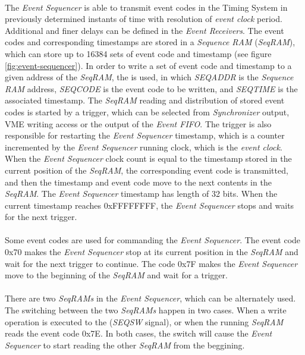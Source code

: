 \documentclass[openany]{article}
\begin{document}
			\paragraph{} The \emph{Event Sequencer} is able to transmit event codes in the Timing System in previously determined instants of time with resolution of \emph{event clock} period. Additional and finer delays can be defined in the \emph{Event Receivers}. The event codes and corresponding timestamps are stored in a \emph{Sequence RAM} (\emph{SeqRAM}), which can store up to 16384 sets of event code and timestamp (see figure \ref{fig:event-sequencer}). In order to write a set of event code and timestamp to a given address of the \emph{SeqRAM}, the  is used, in which \emph{SEQADDR} is the \emph{Sequence RAM} address, \emph{SEQCODE} is the event code to be written, and \emph{SEQTIME} is the associated timestamp. The \emph{SeqRAM} reading and distribution of stored event codes is started by a trigger, which can be selected from \emph{Synchronizer} output, VME writing access or the output of the \emph{Event FIFO}. The trigger is also responsible for restarting the \emph{Event Sequencer} timestamp, which is a counter incremented by the \emph{Event Sequencer} running clock, which is the \emph{event clock}. When the \emph{Event Sequencer} clock count is equal to the timestamp stored in the current position of the \emph{SeqRAM}, the corresponding event code is transmitted, and then the timestamp and event code move to the next contents in the \emph{SeqRAM}. The \emph{Event Sequencer} timestamp has length of 32 bits. When the current timestamp reaches 0xFFFFFFFF, the \emph{Event Sequencer} stops and waits for the next trigger.
			\paragraph{} Some event codes are used for commanding the \emph{Event Sequencer}. The event code 0x70 makes the \emph{Event Sequencer} stop at its current position in the \emph{SeqRAM} and wait for the next trigger to continue. The code 0x7F makes the \emph{Event Sequencer} move to the beginning of the \emph{SeqRAM} and wait for a trigger. 
			\paragraph{} There are two \emph{SeqRAMs} in the \emph{Event Sequencer}, which can be alternately used. The switching between the two \emph{SeqRAMs} happen in two cases. When a write operation is executed to the \emph{} (\emph{SEQSW} signal), or when the running \emph{SeqRAM} reads the event code 0x7E. In both cases, the switch will cause the \emph{Event Sequencer} to start reading the other \emph{SeqRAM} from the beggining.
\end{document}
